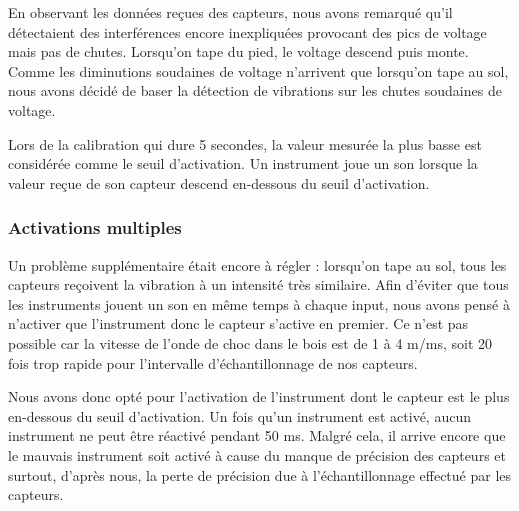 \documentclass[11pt,a4paper,twoside,svgnames]{article}
\begin{document}
	En observant les données reçues des capteurs, nous avons remarqué qu'il détectaient des interférences encore inexpliquées provocant des pics de voltage mais pas de chutes. Lorsqu'on tape du pied, le voltage descend puis monte. Comme les diminutions soudaines de voltage n'arrivent que lorsqu'on tape au sol, nous avons décidé de baser la détection de vibrations sur les chutes soudaines de voltage.
	
	Lors de la calibration qui dure 5 secondes, la valeur mesurée la plus basse est considérée comme le seuil d'activation. Un instrument joue un son lorsque la valeur reçue de son capteur descend en-dessous du seuil d'activation.
	
	\subsubsection{Activations multiples}
	Un problème supplémentaire était encore à régler : lorsqu'on tape au sol, tous les capteurs reçoivent la vibration à un intensité très similaire. Afin d'éviter que tous les instruments jouent un son en même temps à chaque input, nous avons pensé à n'activer que l'instrument donc le capteur s'active en premier. Ce n'est pas possible car la vitesse de l'onde de choc dans le bois est de 1 à 4 m/ms, soit 20 fois trop rapide pour l'intervalle d'échantillonnage de nos capteurs.
	
	Nous avons donc opté pour l'activation de l'instrument dont le capteur est le plus en-dessous du seuil d'activation. Un fois qu'un instrument est activé, aucun instrument ne peut être réactivé pendant 50 ms. Malgré cela, il arrive encore que le mauvais instrument soit activé à cause du manque de précision des capteurs et surtout, d'après nous, la perte de précision due à l'échantillonnage effectué par les capteurs.
		
\end{document}
